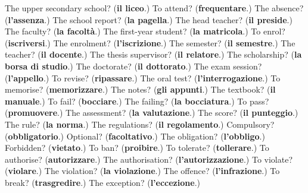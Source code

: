 \begin{tcolorbox}[breakable,colback=teal!4,colframe=teal!35!black,title={Before you move on}]
The upper secondary school? (\textbf{il liceo}.) To attend? (\textbf{frequentare}.) The absence? (\textbf{l'assenza}.) The school report? (\textbf{la pagella}.) The head teacher? (\textbf{il preside}.) The faculty? (\textbf{la facoltà}.) The first-year student? (\textbf{la matricola}.) To enrol? (\textbf{iscriversi}.) The enrolment? (\textbf{l'iscrizione}.) The semester? (\textbf{il semestre}.) The teacher? (\textbf{il docente}.) The thesis supervisor? (\textbf{il relatore}.) The scholarship? (\textbf{la borsa di studio}.) The doctorate? (\textbf{il dottorato}.) The exam session? (\textbf{l'appello}.) To revise? (\textbf{ripassare}.) The oral test? (\textbf{l'interrogazione}.) To memorise? (\textbf{memorizzare}.) The notes? (\textbf{gli appunti}.) The textbook? (\textbf{il manuale}.) To fail? (\textbf{bocciare}.) The failing? (\textbf{la bocciatura}.) To pass? (\textbf{promuovere}.) The assessment? (\textbf{la valutazione}.) The score? (\textbf{il punteggio}.) The rule? (\textbf{la norma}.) The regulations? (\textbf{il regolamento}.) Compulsory? (\textbf{obbligatorio}.) Optional? (\textbf{facoltativo}.) The obligation? (\textbf{l'obbligo}.) Forbidden? (\textbf{vietato}.) To ban? (\textbf{proibire}.) To tolerate? (\textbf{tollerare}.) To authorise? (\textbf{autorizzare}.) The authorisation? (\textbf{l'autorizzazione}.) To violate? (\textbf{violare}.) The violation? (\textbf{la violazione}.) The offence? (\textbf{l'infrazione}.) To break? (\textbf{trasgredire}.) The exception? (\textbf{l'eccezione}.)
\end{tcolorbox}
